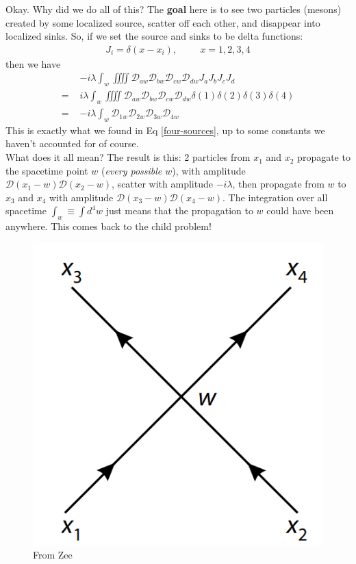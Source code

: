 \documentclass{book}
\theoremstyle{definition}
\newcommand{\D}{\mathcal{D}}
\begin{document}
Okay. Why did we do all of this? The \textbf{goal} here is to see two particles (mesons) created by some localized source, scatter off each other, and disappear into localized sinks. So, if we set the source and sinks to be delta functions:
\begin{align}
J_i = \delta(x - x_i), \hspace{1cm} x = 1,2,3,4
\end{align}
then we have
\begin{align}
&-i\lambda \int_w  \iiiint \D_{aw}\D_{bw}\D_{cw}\D_{dw}J_aJ_bJ_cJ_d \\
=\,\,&i\lambda \int_w  \iiiint \D_{aw}\D_{bw}\D_{cw}\D_{dw}\delta(1)\delta(2)\delta(3)\delta(4) \\ 
=\,&\boxed{-i\lambda \int_w \D_{1w}\D_{2w}\D_{3w}\D_{4w}}
\end{align}
This is exactly what we found in Eq \eqref{four-sources}, up to some constants we haven't accounted for of course. \\

What does it all mean? The result is this: 2 particles from $x_1$ and $x_2$ propagate to the spacetime point $w$ (\textit{every possible $w$}), with amplitude $\D(x_1 - w)\D(x_2 - w)$, scatter with amplitude $-i\lambda$, then propagate from $w$ to $x_3$ and $x_4$ with amplitude $\D(x_3 - w)\D(x_4 - w)$. The integration over all spacetime $\int_w \equiv \int d^4w$ just means that the propagation to $w$ could have been anywhere. This comes back to the child problem!
\begin{figure}[!htb]
	\centering
	\includegraphics[scale=0.3]{propagates}
	\caption{From Zee}
\end{figure}
\end{document}
